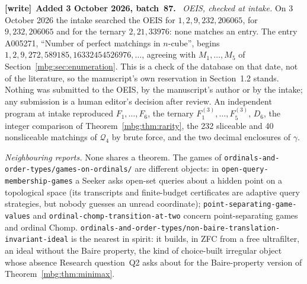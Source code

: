 \documentclass[11pt,letterpaper]{article}
\theoremstyle{definition}
\newenvironment{writenote}[1][]{\par\smallskip\begingroup\small
 \noindent\textbf{[write]}\if\relax\detokenize{#1}\relax\else~\textbf{#1.}\fi\ }%
 {\par\endgroup\smallskip}
\begin{document}
\begin{writenote}[Added 3 October 2026, batch~87]
\emph{OEIS, checked at intake.} On 3 October 2026 the intake searched the OEIS for $1,2,9,232,206065$, for $9,232,206065$ and for the ternary $2,21,33976$: none matches an entry. The entry A005271, ``Number of perfect matchings in $n$-cube'', begins $1,2,9,272,589185,16332454526976,\ldots$, agreeing with $M_1,\ldots,M_5$ of Section~\ref{mbg:sec:enumeration}. This is a check of the database on that date, not of the literature, so the manuscript's own reservation in Section~1.2 stands. Nothing was submitted to the OEIS, by the manuscript's author or by the intake; any submission is a human editor's decision after review. An independent program at intake reproduced $F_1,\ldots,F_6$, the ternary $F^{(3)}_1,\ldots,F^{(3)}_5$, $D_6$, the integer comparison of Theorem~\ref{mbg:thm:rarity}, the 232 sliceable and 40 nonsliceable matchings of $\mathcal Q_4$ by brute force, and the two decimal enclosures of $\gamma$.

\emph{Neighbouring reports.} None shares a theorem. The games of \nolinkurl{ordinals-and-order-types/games-on-ordinals/} are different objects: in \nolinkurl{open-query-membership-games} a Seeker asks open-set queries about a hidden point on a topological space (its transcripts and finite-budget certificates are adaptive query strategies, but nobody guesses an unread coordinate); \nolinkurl{point-separating-game-values} and \nolinkurl{ordinal-chomp-transition-at-two} concern point-separating games and ordinal Chomp. \nolinkurl{ordinals-and-order-types/non-baire-translation-invariant-ideal} is the nearest in spirit: it builds, in ZFC from a free ultrafilter, an ideal without the Baire property, the kind of choice-built irregular object whose absence Research question~Q2 asks about for the Baire-property version of Theorem~\ref{mbg:thm:minimax}.
\end{writenote}
\end{document}
